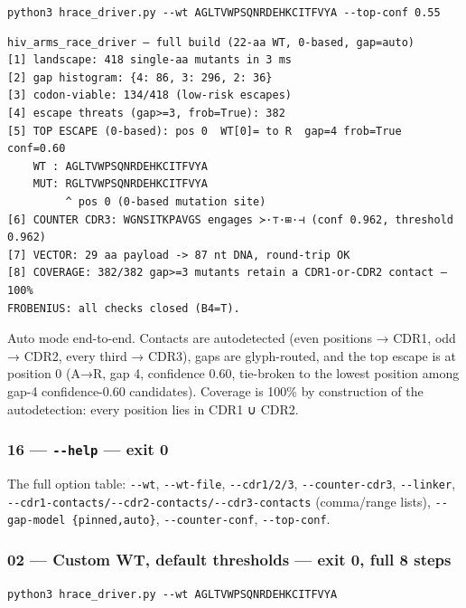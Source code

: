 \texttt{python3\ hrace\_driver.py\ -\/-wt\ AGLTVWPSQNRDEHKCITFVYA\ -\/-top-conf\ 0.55}

\begin{verbatim}
hiv_arms_race_driver — full build (22-aa WT, 0-based, gap=auto)
[1] landscape: 418 single-aa mutants in 3 ms
[2] gap histogram: {4: 86, 3: 296, 2: 36}
[3] codon-viable: 134/418 (low-risk escapes)
[4] escape threats (gap>=3, frob=True): 382
[5] TOP ESCAPE (0-based): pos 0  WT[0]= to R  gap=4 frob=True conf=0.60
    WT : AGLTVWPSQNRDEHKCITFVYA
    MUT: RGLTVWPSQNRDEHKCITFVYA
         ^ pos 0 (0-based mutation site)
[6] COUNTER CDR3: WGNSITKPAVGS engages ≻·⊤·⊞·⊣ (conf 0.962, threshold 0.962)
[7] VECTOR: 29 aa payload -> 87 nt DNA, round-trip OK
[8] COVERAGE: 382/382 gap>=3 mutants retain a CDR1-or-CDR2 contact — 100%
FROBENIUS: all checks closed (B4=T).
\end{verbatim}

Auto mode end-to-end. Contacts are autodetected (even positions → CDR1,
odd → CDR2, every third → CDR3), gaps are glyph-routed, and the top
escape is at position 0 (A→R, gap 4, confidence 0.60, tie-broken to the
lowest position among gap-4 confidence-0.60 candidates). Coverage is
100\% by construction of the autodetection: every position lies in CDR1
∪ CDR2.

\hypertarget{help-exit-0}{%
\subsubsection{\texorpdfstring{16 --- \texttt{-\/-help} --- exit
0}{16 --- -\/-help --- exit 0}}\label{help-exit-0}}

The full option table: \texttt{-\/-wt}, \texttt{-\/-wt-file},
\texttt{-\/-cdr1/2/3}, \texttt{-\/-counter-cdr3}, \texttt{-\/-linker},
\texttt{-\/-cdr1-contacts/-\/-cdr2-contacts/-\/-cdr3-contacts}
(comma/range lists), \texttt{-\/-gap-model\ \{pinned,auto\}},
\texttt{-\/-counter-conf}, \texttt{-\/-top-conf}.

\hypertarget{custom-wt-default-thresholds-exit-0-full-8-steps}{%
\subsubsection{02 --- Custom WT, default thresholds --- exit 0, full 8
steps}\label{custom-wt-default-thresholds-exit-0-full-8-steps}}

\texttt{python3\ hrace\_driver.py\ -\/-wt\ AGLTVWPSQNRDEHKCITFVYA}

